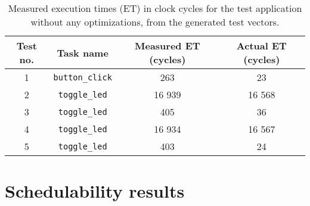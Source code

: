 \begin{table}[H]
    \centering
    \begin{tabular}{|c | c | c | c|}
        \hline
        Test no. & Task name & Measured ET (cycles) & Actual ET (cycles) \\ [0.5ex]
        \hline
        1 & \texttt{button\_click} & 263 & 23 \\
        \hline
        2 & \texttt{toggle\_led} & 16 939 & 16 568 \\
        \hline
        3 & \texttt{toggle\_led} & 405 & 36 \\
        \hline
        4 & \texttt{toggle\_led} & 16 934 & 16 567 \\
        \hline
        5 & \texttt{toggle\_led} & 403 & 24 \\
        \hline
    \end{tabular}
    \caption{Measured execution times (ET) in clock cycles for the test application without any optimizations, from the generated test vectors.}
    \label{tab:evalreleasemeasure}
\end{table}

\section{Schedulability results}
